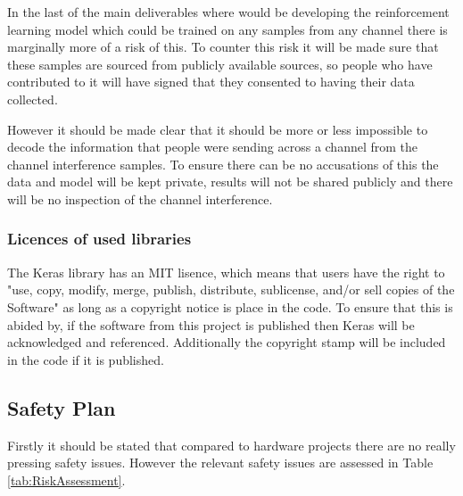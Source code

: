 \documentclass[12pt,onecolumn,letterpaper]{article}
\begin{document}
In the last of the main deliverables where would be developing the reinforcement learning model which could be trained on any samples from any channel there is marginally more of a risk of this. To counter this risk it will be made sure that these samples are sourced from publicly available sources, so people who have contributed to it will have signed that they consented to having their data collected. 

However it should be made clear that it should be more or less impossible to decode the information that people were sending across a channel from the channel interference samples. To ensure there can be no accusations of this the data and model will be kept private, results will not be shared publicly and there will be no inspection of the channel interference.

\subsubsection{Licences of used libraries}

The Keras library has an MIT lisence, which means that users have the right to "use, copy, modify, merge, publish, distribute, sublicense, and/or sell copies of the Software" as long as a copyright notice is place in the code. To ensure that this is abided by, if the software from this project is published then Keras will be acknowledged and referenced. Additionally the copyright stamp will be included in the code if it is published. 

\subsection{Safety Plan}

Firstly it should be stated that compared to hardware projects there are no really pressing safety issues. However the relevant safety issues are assessed in Table \ref{tab:RiskAssessment}. 
\end{document}
